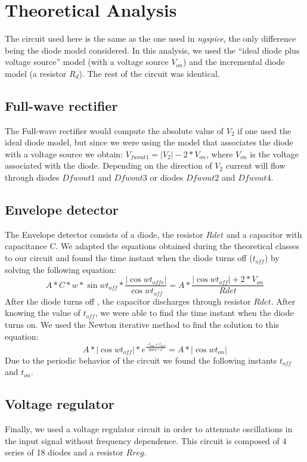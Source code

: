 \section{Theoretical Analysis}
\label{sec:analysis}



The circuit used here is the same as the one used in \textit{ngspice}, the only difference being the diode model considered. In this analysis, we used the ``ideal diode plus voltage source'' model (with a voltage source $V_{on}$) and the incremental diode model (a resistor $R_d$). The rest of the circuit was identical.

\subsection{Full-wave rectifier}
The Full-wave rectifier would  compute the  absolute value of $V_2$ if one used the ideal diode model, but since we were using the model that associates the diode with a voltage source we obtain: $V_{fwout1} = |V_2|- 2*V_{on}$, where $V_{on}$ is the voltage associated with the diode. Depending on the direction of $V_2$ current will flow through diodes $Dfwout1$ and $Dfwout3$ or diodes $Dfwout2$ and $Dfwout4$.

\subsection{Envelope detector}
The Envelope detector consists of a diode, the resistor $Rdet$ and a capacitor with capacitance C. We adapted the equations obtained during the theoretical classes to our circuit and found the time instant when the diode turns off ($t_{off}$) by solving the following equation:
\begin{equation}
  A*C*w*\sin{wt_{off}}*\frac{|\cos{wt_{offs}}|}{\cos{wt_{off}}} =  A*\frac{|\cos{wt_{off}}|+2*V_{on}}{Rdet}
\end{equation}
After the diode turns off , the capacitor discharges through resistor $Rdet$.
After knowing the value of $t_{off}$, we were able to find the time instant when the diode turns on. We used the Newton iterative method to find the solution to this equation:
\begin{equation}
   A*|\cos{wt_{off}}|*e^{\frac{-t_{on}+t_{off}}{Rdet*C}}=  A*|\cos{wt_{on}}|
\end{equation}
Due to the periodic behavior of the circuit we found the following instants $t_{off}$ and $t_{on}$.  
\subsection{Voltage regulator}
Finally, we used a voltage regulator circuit in order to attenuate oscillations in the input signal without frequency dependence. This circuit is composed of 4 series of 18 diodes and a resistor $Rreg$.

